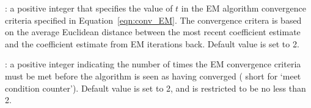 : a positive integer that specifies the value of \(t\) in the
EM algorithm convergence criteria specified in Equation~\ref{eqn:conv_EM}. The convergence critera is based on the average
Euclidean distance between the most recent coefficient estimate and the
coefficient estimate from  EM iterations back. Default value
is set to 2.

: a positive integer indicating the number of times the EM
convergence criteria must be met before the algorithm is seen as having
converged ( short for `meet condition counter'). Default
value is set to 2, and  is restricted to be no less than 2.





